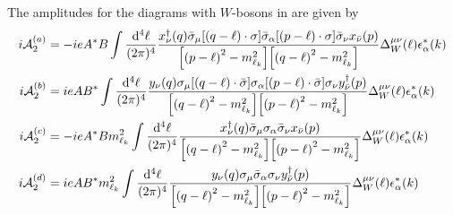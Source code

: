 The amplitudes for the diagrams with \(W\)-bosons in  are given by
\begin{align}
	i\mathcal{A}^{(a)}_{2}
	 & =
	-ieA^{*}B
	\int\frac{\dd[4]{\ell}}{(2\pi)^{4}}
	\frac{
	x_{\nu}^{\dagger}(q)
	\bar{\sigma}_{\mu}
	\qty[\qty(q-\ell)\cdot\sigma]
	\bar{\sigma}_{\alpha}
	\qty[\qty(p-\ell)\cdot\sigma]
	\bar{\sigma}_{\nu}
	x_{\bar{\nu}}(p)
	}{
	\qty[\qty(p-\ell)^{2}-m_{\ell_{k}}^{2}]\qty[\qty(q-\ell)^{2}-m_{\ell_{k}}^{2}]
	}
	\Delta^{\mu\nu}_{W}(\ell)
	\epsilon^{*}_{\alpha}(k)
	\\
	i\mathcal{A}^{(b)}_{2}
	 & =
	ieAB^{*}
	\int\frac{\dd[4]{\ell}}{(2\pi)^{4}}
	\frac{
	y_{\nu}(q)
	\sigma_{\mu}
	\qty[\qty(q-\ell)\cdot\bar{\sigma}]
	\sigma_{\alpha}
	\qty[\qty(p-\ell)\cdot\bar{\sigma}]
	\sigma_{\nu}
	y_{\bar{\nu}}^{\dagger}(p)
	}{
	\qty[\qty(q-\ell)^{2}-m_{\ell_{k}}^{2}]\qty[\qty(p-\ell)^{2}-m_{\ell_{k}}^{2}]
	}
	\Delta^{\mu\nu}_{W}(\ell)
	\epsilon^{*}_{\alpha}(k)
	\\
	i\mathcal{A}^{(c)}_{2}
	 & =
	-ieA^{*}B m^{2}_{\ell_{k}}
	\int\frac{\dd[4]{\ell}}{(2\pi)^{4}}
	\frac{
	x_{\nu}^{\dagger}(q)
	\bar{\sigma}_{\mu}\sigma_{\alpha}\bar{\sigma}_{\nu}
	x_{\bar{\nu}}(p)
	}{
	\qty[\qty(q-\ell)^{2}-m_{\ell_{k}}^{2}]\qty[\qty(p-\ell)^{2}-m_{\ell_{k}}^{2}]
	}
	\Delta^{\mu\nu}_{W}(\ell)
	\epsilon^{*}_{\alpha}(k)
	\\
	i\mathcal{A}^{(d)}_{2}
	 & =
	ieAB^{*}m^{2}_{\ell_{k}}
	\int\frac{\dd[4]{\ell}}{(2\pi)^{4}}
	\frac{
	y_{\nu}(q)
	\sigma_{\mu}
	\bar{\sigma}_{\alpha}
	\sigma_{\nu}
	y_{\bar{\nu}}^{\dagger}(p)
	}{
	\qty[\qty(q-\ell)^{2}-m_{\ell_{k}}^{2}]\qty[\qty(p-\ell)^{2}-m_{\ell_{k}}^{2}]
	}
	\Delta^{\mu\nu}_{W}(\ell)
	\epsilon^{*}_{\alpha}(k)
\end{align}



